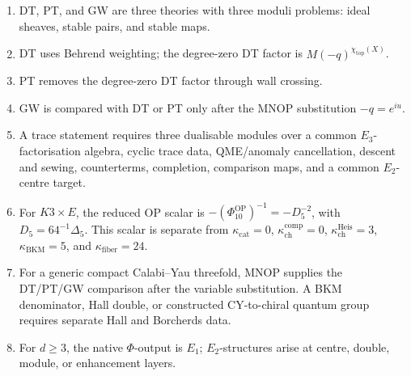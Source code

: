\documentclass[11pt]{article}
\providecommand{\kchcomp}{\kappa_{\mathrm{ch}}^{\mathrm{comp}}}
\providecommand{\kchHeis}{\kappa_{\mathrm{ch}}^{\mathrm{Heis}}}
\providecommand{\kcat}{\kappa_{\mathrm{cat}}}
\providecommand{\kBKM}{\kappa_{\mathrm{BKM}}}
\providecommand{\kfib}{\kappa_{\mathrm{fiber}}}
\providecommand{\Eone}{E_1}
\providecommand{\Etwo}{E_2}
\providecommand{\Ethree}{E_3}
\providecommand{\DeltaFive}{\Delta_5}
\providecommand{\PhiTen}{\Phi_{10}}
\providecommand{\Dfive}{D_5}
\begin{document}
\begin{enumerate}
\item DT, PT, and GW are three theories with three moduli problems:
ideal sheaves, stable pairs, and stable maps.
\item DT uses Behrend weighting; the degree-zero DT factor is
\(M(-q)^{\chi_{\mathrm{top}}(X)}\).
\item PT removes the degree-zero DT factor through wall crossing.
\item GW is compared with DT or PT only after the MNOP substitution
\(-q=e^{iu}\).
\item A trace statement requires three dualisable modules over a common
\(\Ethree\)-factorisation algebra, cyclic trace data, QME/anomaly
cancellation, descent and sewing, counterterms, completion, comparison
maps, and a common \(\Etwo\)-centre target.
\item For \(K3\times E\), the reduced OP scalar is
\(-(\PhiTen^{\mathrm{OP}})^{-1}=-\Dfive^{-2}\), with
\(\Dfive=64^{-1}\DeltaFive\).  This scalar is separate from
\(\kcat=0\), \(\kchcomp=0\), \(\kchHeis=3\), \(\kBKM=5\), and
\(\kfib=24\).
\item For a generic compact Calabi--Yau threefold, MNOP supplies the
DT/PT/GW comparison after the variable substitution. A BKM denominator,
Hall double, or constructed CY-to-chiral quantum group requires separate
Hall and Borcherds data.
\item For \(d\geq 3\), the native \(\Phi\)-output is \(\Eone\);
\(\Etwo\)-structures arise at centre, double, module, or enhancement
layers.
\end{enumerate}
\end{document}
